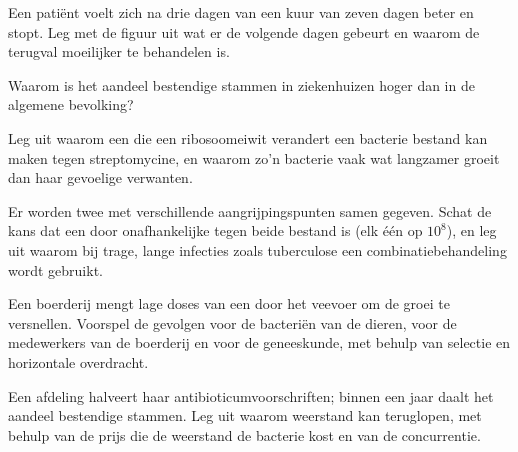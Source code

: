 \begin{exercise}[$\star\star$]\label{exo:g11:antibiotic-resistance:9}
Een patiënt voelt zich na drie dagen van een kuur van zeven dagen beter
en stopt. Leg met de figuur uit wat er de volgende dagen gebeurt en
waarom de terugval moeilijker te behandelen is.
\end{exercise}

\begin{exercise}[$\star\star$]\label{exo:g11:antibiotic-resistance:10}
Waarom is het aandeel bestendige stammen in ziekenhuizen hoger dan in de
algemene bevolking?
\end{exercise}

\begin{exercise}[$\star\star$]\label{exo:g11:antibiotic-resistance:11}
Leg uit waarom een  die een ribosoomeiwit verandert een bacterie
bestand kan maken tegen streptomycine, en waarom zo'n bacterie vaak wat
langzamer groeit dan haar gevoelige verwanten.
\end{exercise}

\begin{exercise}[$\star\star\star$]\label{exo:g11:antibiotic-resistance:12}
Er worden twee  met verschillende aangrijpingspunten samen
gegeven. Schat de kans dat een  door onafhankelijke  tegen
beide bestand is (elk één op $10^8$), en leg uit waarom bij trage, lange
infecties zoals tuberculose een combinatiebehandeling wordt gebruikt.
\end{exercise}

\begin{exercise}[$\star\star\star$]\label{exo:g11:antibiotic-resistance:13}
Een boerderij mengt lage doses van een  door het veevoer om
de groei te versnellen. Voorspel de gevolgen voor de bacteriën van de
dieren, voor de medewerkers van de boerderij en voor de geneeskunde, met
behulp van selectie en horizontale overdracht.
\end{exercise}

\begin{exercise}[$\star\star\star$]\label{exo:g11:antibiotic-resistance:14}
Een afdeling halveert haar antibioticumvoorschriften; binnen een jaar
daalt het aandeel bestendige stammen. Leg uit waarom weerstand kan
teruglopen, met behulp van de prijs die de weerstand de bacterie kost en
van de concurrentie.
\end{exercise}

